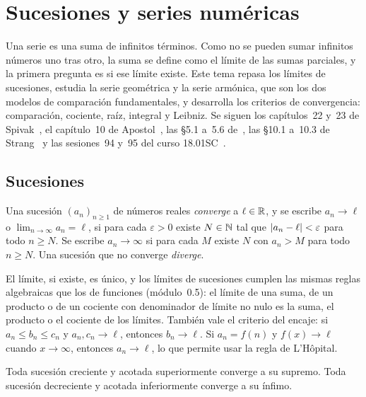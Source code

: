 \chapter{Sucesiones y series numéricas}
\label{tema:5}

Una serie es una suma de infinitos términos. Como no se pueden sumar infinitos números uno tras otro, la suma se define como el límite de las sumas parciales, y la primera pregunta es si ese límite existe. Este tema repasa los límites de sucesiones, estudia la serie geométrica y la serie armónica, que son los dos modelos de comparación fundamentales, y desarrolla los criterios de convergencia: comparación, cociente, raíz, integral y Leibniz. Se siguen los capítulos~22 y~23 de Spivak~\cite{spivak}, el capítulo~10 de Apostol~\cite{apostol}, las §5.1 a~5.6 de~\cite{openstax2}, las §10.1 a~10.3 de Strang~\cite{strang} y las sesiones~94 y~95 del curso 18.01SC~\cite{mit1801}.

\section{Sucesiones}

\begin{definicion}\label{def:limite-sucesion}
Una sucesión $(a_n)_{n\ge1}$ de números reales \emph{converge} a $\ell\in\mathbb{R}$, y se escribe $a_n\to\ell$ o $\lim_{n\to\infty}a_n=\ell$, si para cada $\varepsilon>0$ existe $N\in\mathbb{N}$ tal que $\lvert a_n-\ell\rvert<\varepsilon$ para todo $n\ge N$. Se escribe $a_n\to\infty$ si para cada $M$ existe $N$ con $a_n>M$ para todo $n\ge N$. Una sucesión que no converge \emph{diverge}.
\end{definicion}

El límite, si existe, es único, y los límites de sucesiones cumplen las mismas reglas algebraicas que los de funciones (módulo~0.5): el límite de una suma, de un producto o de un cociente con denominador de límite no nulo es la suma, el producto o el cociente de los límites. También vale el criterio del encaje: si $a_n\le b_n\le c_n$ y $a_n,c_n\to\ell$, entonces $b_n\to\ell$. Si $a_n=f(n)$ y $f(x)\to\ell$ cuando $x\to\infty$, entonces $a_n\to\ell$, lo que permite usar la regla de L'Hôpital.

\begin{teorema}\label{teo:monotona-acotada}
Toda sucesión creciente y acotada superiormente converge a su supremo. Toda sucesión decreciente y acotada inferiormente converge a su ínfimo.
\end{teorema}


